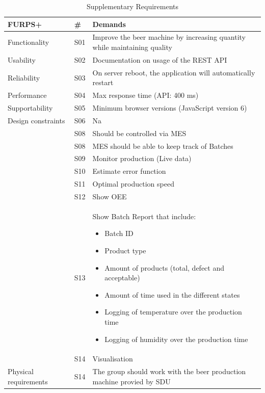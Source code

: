 \begin{table}[ht]
    \begin{tabularx}{\textwidth}{|>{\RaggedRight}p{3.3cm}|>{\RaggedRight}p{0.6cm}|>{\RaggedRight}X|}
        \hline
        \textbf{FURPS+}  & \textbf{\#} & \textbf{Demands} \\
        \hline
        Functionality  	& S01 & Improve the beer machine by increasing quantity while maintaining quality \\
        \hline
        Usability      	& S02 & Documentation on usage of the REST API \\
        \hline
        Reliability    	& S03 & On server reboot, the application will automatically restart \\
        \hline
        Performance    	& S04 & Max response time (API: 400 ms) \\
        \hline
        Supportability 	& S05 & Minimum browser versions (JavaScript version 6)\\
        \hline
        Design constraints 	& S06 & Na \\
        \hline
        \multirow{5}{100}{Implementation requirements} & S08 & Should be controlled via MES\\
        \cline{2-3}
                & S08 & MES should be able to keep track of Batches\\
        \cline{2-3}
                & S09 & Monitor production (Live data)\\
        \cline{2-3}
                & S10 & Estimate error function\\
        \cline{2-3}
                & S11 & Optimal production speed\\
        \hline
        \multirow{14}{100}{Interface requirements } & S12 & Show OEE \\
        \cline{2-3}
                & S13 & Show Batch Report that include:
            \begin{itemize}
                \item Batch ID
                \item Product type
                \item Amount of products (total, defect and acceptable)
                \item Amount of time used in the different states
                \item Logging of temperature over the production time
                \item Logging of humidity over the production time
            \end{itemize} \\
        \cline{2-3}
            & S14 & Visualisation \\
        \hline
        Physical requirements & S14 & The group should work with the beer 
        production machine provied by SDU \\
        \hline
    \end{tabularx}
    \caption{Supplementary Requirements} 
    \label{table:sup_requirements}
\end{table} 

